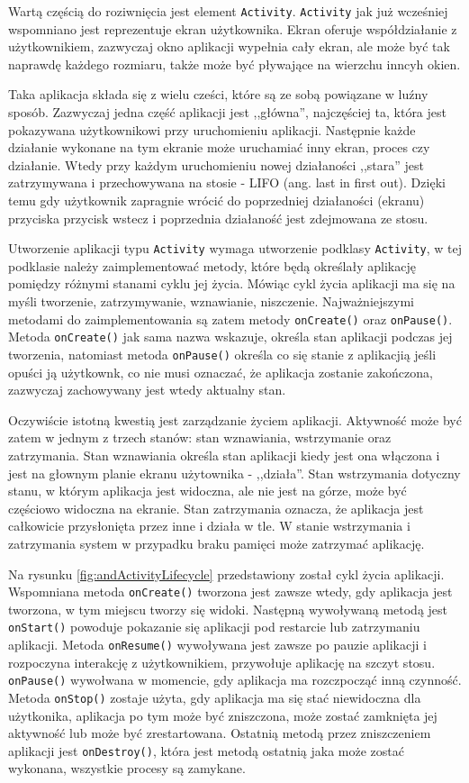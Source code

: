 \documentclass[eng,printmode,oneside]{mgr}
\begin{document}
Wartą częścią do roziwnięcia jest element \texttt{Activity}. \texttt{Activity}
jak już wcześniej wspomniano jest reprezentuje ekran użytkownika. Ekran oferuje
współdziałanie z użytkownikiem, zazwyczaj okno aplikacji wypełnia cały ekran,
ale może być tak naprawdę każdego rozmiaru, także może być pływające na wierzchu
inncyh okien. 

Taka aplikacja składa się z wielu cześci, które są ze sobą
powiązane w luźny sposób. Zazwyczaj jedna część aplikacji jest ,,główna'',
najczęściej ta, która jest pokazywana użytkownikowi przy uruchomieniu aplikacji.
Następnie każde działanie wykonane na tym ekranie może uruchamiać inny ekran,
proces czy działanie. Wtedy przy każdym uruchomieniu nowej działaności ,,stara''
jest zatrzymywana i przechowywana na stosie - LIFO (ang. last in first out).
Dzięki temu gdy użytkownik zapragnie wrócić do poprzedniej działaności (ekranu)
przyciska przycisk wstecz i poprzednia działaność jest zdejmowana ze stosu.

Utworzenie aplikacji typu \texttt{Activity} wymaga utworzenie podklasy
\texttt{Activity}, w tej podklasie należy zaimplementować metody, które będą
określały aplikację pomiędzy różnymi stanami cyklu jej życia. Mówiąc cykl życia
aplikacji ma się na myśli tworzenie, zatrzymywanie, wznawianie, niszczenie.
Najważniejszymi metodami do zaimplementowania są zatem metody
\texttt{onCreate()} oraz \texttt{onPause()}. Metoda \texttt{onCreate()} jak sama
nazwa wskazuje, określa stan aplikacji podczas jej tworzenia, natomiast metoda
\texttt{onPause()} określa co się stanie z aplikacjią jeśli opuści ją użytkownk,
co nie musi oznaczać, że aplikacja zostanie zakończona, zazwyczaj zachowywany
jest wtedy aktualny stan.

Oczywiście istotną kwestią jest zarządzanie życiem aplikacji. Aktywność może być
zatem w jednym z trzech stanów: stan wznawiania, wstrzymanie oraz
zatrzymania. Stan wznawiania określa stan aplikacji kiedy jest ona włączona i
jest na głownym planie ekranu użytownika - ,,działa''. Stan wstrzymania dotyczny
stanu, w którym aplikacja jest widoczna, ale nie jest na górze, może być
częściowo widoczna na ekranie. Stan zatrzymania oznacza, że aplikacja jest
całkowicie przysłonięta przez inne i działa w tle. W stanie wstrzymania i
zatrzymania system w przypadku braku pamięci może zatrzymać aplikację.

Na rysunku \ref{fig:andActivityLifecycle} przedstawiony został cykl życia
aplikacji. Wspomniana metoda \texttt{onCreate()} tworzona jest zawsze wtedy, gdy
aplikacja jest tworzona, w tym miejscu tworzy się widoki. Następną
wywoływaną metodą jest \texttt{onStart()} powoduje pokazanie się aplikacji pod
restarcie lub zatrzymaniu aplikacji. Metoda \texttt{onResume()} wywoływana jest
zawsze po pauzie aplikacji i rozpoczyna interakcję z użytkownikiem, przywołuje
aplikację na szczyt stosu. \texttt{onPause()} wywołwana w momencie, gdy
aplikacja ma rozczpocząć inną czynność. Metoda \texttt{onStop()} zostaje użyta,
gdy aplikacja ma się stać niewidoczna dla użytkonika, aplikacja po tym może być
zniszczona, może zostać zamknięta jej aktywność lub może być zrestartowana.
Ostatnią metodą przez zniszczeniem aplikacji jest \texttt{onDestroy()}, która
jest metodą ostatnią jaka może zostać wykonana, wszystkie procesy są zamykane.
\end{document}
